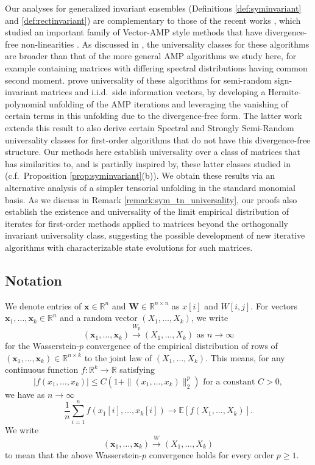 \documentclass[10pt,reqno]{amsart}
\def\x{\mathbf{x}}
\def\W{\mathbf{W}}
\def\E{\mathbb{E}}
\def\R{\mathbb{R}}
\def\toW{\overset{W}{\to}}
\def\toWp{\overset{W_p}{\to}}
\begin{document}
Our analyses for generalized invariant ensembles (Definitions
\ref{def:syminvariant} and \ref{def:rectinvariant}) are complementary to those of
the recent works \cite{dudeja2022universality,dudeja2022spectral}, which
studied an important family of Vector-AMP style
methods that have divergence-free non-linearities
\cite{schniter2016vector,ma2017orthogonal,takeuchi2017rigorous,ccakmak2019memory}.
As discussed in \cite{dudeja2022spectral},
the universality classes for these algorithms are broader than that of the more
general AMP algorithms we study here, for example containing matrices
with differing spectral distributions having common second moment.
\cite{dudeja2022universality,dudeja2022spectral} prove universality of these
algorithms for semi-random sign-invariant matrices and i.i.d.\ side
information vectors, by developing a Hermite-polynomial unfolding of the
AMP iterations and leveraging the vanishing of certain terms in this unfolding
due to the divergence-free form. The latter work \cite{dudeja2022spectral}
extends this result to also derive certain Spectral and Strongly Semi-Random
universality classes for first-order algorithms
that do not have this divergence-free structure. Our methods here establish
universality over a class of matrices that has similarities to, and is
partially inspired by, these latter classes studied in \cite{dudeja2022spectral}
(c.f.\ Proposition \ref{prop:syminvariant}(b)). We obtain these results via
an alternative
analysis of a simpler tensorial unfolding in the standard monomial basis.
As we discuss in Remark \ref{remark:sym_tn_universality}, our proofs also
establish the existence and universality of the limit empirical distribution
of iterates for first-order methods applied to matrices beyond
the orthogonally invariant universality class, suggesting the possible
development of new iterative algorithms with characterizable state evolutions
for such matrices.

\subsection{Notation}
We denote entries of $\x \in \R^n$ and $\W \in \R^{n \times n}$ as
$x[i]$ and $W[i,j]$. For
vectors $\x_1,\ldots,\x_k \in \R^n$ and a random vector $(X_1,\ldots,X_k)$,
we write
\[(\x_1,\ldots,\x_k) \toWp (X_1,\ldots,X_k) \text{ as } n \to \infty\]
for the Wasserstein-$p$ convergence of the empirical
distribution of rows of $(\x_1,\ldots,\x_k) \in \R^{n \times k}$ to the joint
law of $(X_1,\ldots,X_k)$. This means, for any
continuous function $f:\R^k \to \R$ satisfying
\begin{equation}\label{eq:polygrowth}
|f(x_1,\ldots,x_k)| \leq C(1+\|(x_1,\ldots,x_k)\|_2^p)
\text{ for a constant } C>0,
\end{equation}
we have as $n \to \infty$
\begin{equation}\label{eq:Wconvergence}
\frac{1}{n}\sum_{i=1}^n f(x_1[i],\ldots,x_k[i]) \to \E[f(X_1,\ldots,X_k)].
\end{equation}
We write
\[(\x_1,\ldots,\x_k) \toW (X_1,\ldots,X_k)\]
to mean that the above Wasserstein-$p$ convergence holds
for every order $p \geq 1$.
\end{document}
